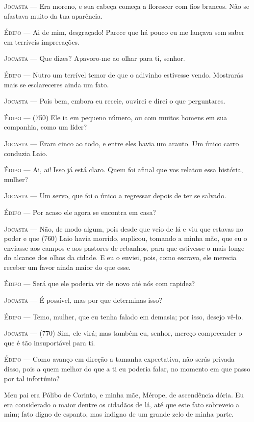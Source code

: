 \textsc{Jocasta} --- Era moreno, e sua cabeça começa a florescer com fios brancos. Não se
afastava muito da tua aparência.

\textsc{Édipo} --- Ai de mim, desgraçado! Parece que há pouco eu me lançava sem saber em
terríveis imprecações.

\textsc{Jocasta} --- Que dizes? Apavoro-me ao olhar para ti, senhor.

\textsc{Édipo} --- Nutro um terrível temor de que o adivinho estivesse vendo. Mostrarás
mais se esclareceres ainda um fato.

\textsc{Jocasta} --- Pois bem, embora eu receie, ouvirei e direi o que perguntares.

\textsc{Édipo} --- (750) Ele ia em pequeno número, ou com muitos homens em sua companhia,
como um líder?

\textsc{Jocasta} --- Eram cinco ao todo, e entre eles havia um arauto. Um único carro
conduzia Laio.

\textsc{Édipo} --- Ai, ai! Isso já está claro. Quem foi afinal que vos relatou essa
história, mulher?

\textsc{Jocasta} --- Um servo, que foi o único a regressar depois de ter se salvado.

\textsc{Édipo} --- Por acaso ele agora se encontra em casa?

\textsc{Jocasta} --- Não, de modo algum, pois desde que veio de lá e viu que estavas no poder
e que (760) Laio havia morrido, suplicou, tomando a minha mão, que eu o
enviasse aos campos e aos pastores de rebanhos, para que estivesse o
mais longe do alcance dos olhos da cidade. E eu o enviei, pois, como
escravo, ele merecia receber um favor ainda maior do que esse.

\textsc{Édipo} --- Será que ele poderia vir de novo até nós com rapidez?

\textsc{Jocasta} --- É possível, mas por que determinas isso?

\textsc{Édipo} --- Temo, mulher, que eu tenha falado em demasia; por isso, desejo vê-lo.

\textsc{Jocasta} --- (770) Sim, ele virá; mas também eu, senhor, mereço compreender o que é
tão insuportável para ti.

\textsc{Édipo} --- Como avanço em direção a tamanha expectativa, não serás privada disso,
pois a quem melhor do que a ti eu poderia falar, no momento em que passo
por tal infortúnio?

Meu pai era Pólibo de Corinto, e minha mãe, Mérope, de ascendência
dória. Eu era considerado o maior dentre os cidadãos de lá, até que este
fato sobreveio a mim; fato digno de espanto, mas indigno de um grande
zelo de minha parte.


